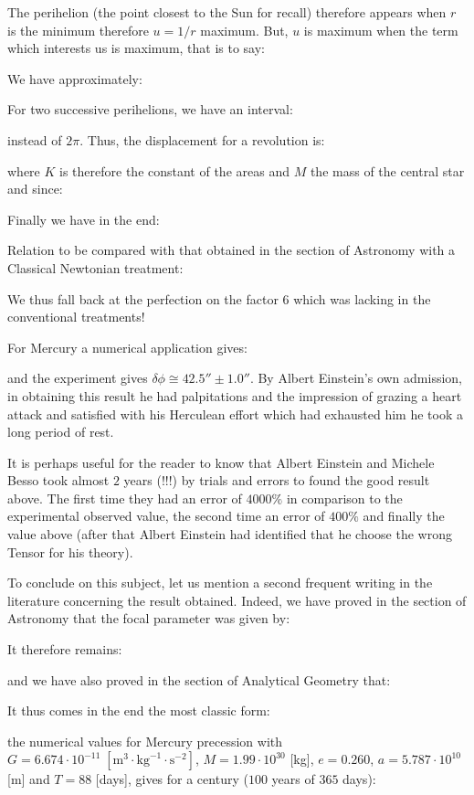 	The perihelion (the point closest to the Sun for recall) therefore appears when $r$ is the minimum therefore $u=1/r$ maximum. But, $u$ is maximum when the term which interests us is maximum, that is to say:
	
	We have approximately:
	
	For two successive perihelions, we have an interval:
	
	instead of $2\pi$. Thus, the displacement for a revolution is:
	
	where $K$ is therefore the constant of the areas and $M$ the mass of the central star and since:
	
	Finally we have in the end:
	
	Relation to be compared with that obtained in the section of Astronomy with a Classical Newtonian treatment:
	
	We thus fall back at the perfection on the factor $6$ which was lacking in the conventional treatments!

	For Mercury a numerical application gives:
	
	and the experiment gives $\delta\phi\cong 42.5''\pm 1.0''$. By Albert Einstein's own admission, in obtaining this result he had palpitations and the impression of grazing a heart attack and satisfied with his Herculean effort which had exhausted him he took a long period of rest.
	\begin{tcolorbox}[title=Remark,colframe=black,arc=10pt]
	It is perhaps useful for the reader to know that Albert Einstein and Michele Besso took almost $2$ years (!!!) by trials and errors to found the good result above. The first time they had an error of $4000\%$ in comparison to the experimental observed value, the second time an error of $400\%$ and finally the value above (after that Albert Einstein had identified that he choose the wrong Tensor for his theory).
	\end{tcolorbox}
	To conclude on this subject, let us mention a second frequent writing in the literature concerning the result obtained. Indeed, we have proved in the section of Astronomy that the focal parameter was given by:
	
	It therefore remains:
	
	and we have also proved in the section of Analytical Geometry that:
	
	It thus comes in the end the most classic form:
	
	 the numerical values for Mercury precession with $G=6.674\cdot 10^{-11}\;[\text{m}^3\cdot\text{kg}^{-1}\cdot \text{s}^{-2} ]$, $M=1.99\cdot 10^{30}$ [kg], $e=0.260$, $a=5.787\cdot 10^{10}$ [m] and $T=88$ [days], gives for a century ($100$ years of $365$ days):
	
